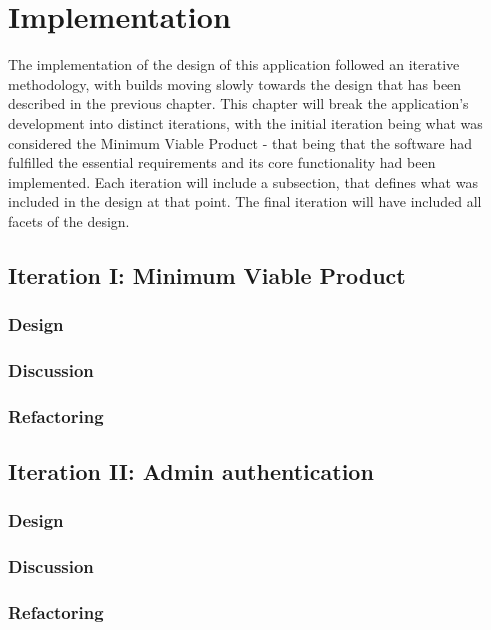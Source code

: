 \chapter{Implementation}

The implementation of the design of this application followed an iterative methodology, with builds moving slowly towards the design that has been described in the previous chapter. This chapter will break the application's development into distinct iterations, with the initial iteration being what was considered the Minimum Viable Product - that being that the software had fulfilled the essential requirements and its core functionality had been implemented. Each iteration will include a subsection, that defines what was included in the design at that point. The final iteration will have included all facets of the design.

\section{Iteration I: Minimum Viable Product}
\subsection{Design}

\subsection{Discussion}

\subsection{Refactoring}

\section{Iteration II: Admin authentication}
\subsection{Design}

\subsection{Discussion}

\subsection{Refactoring}
